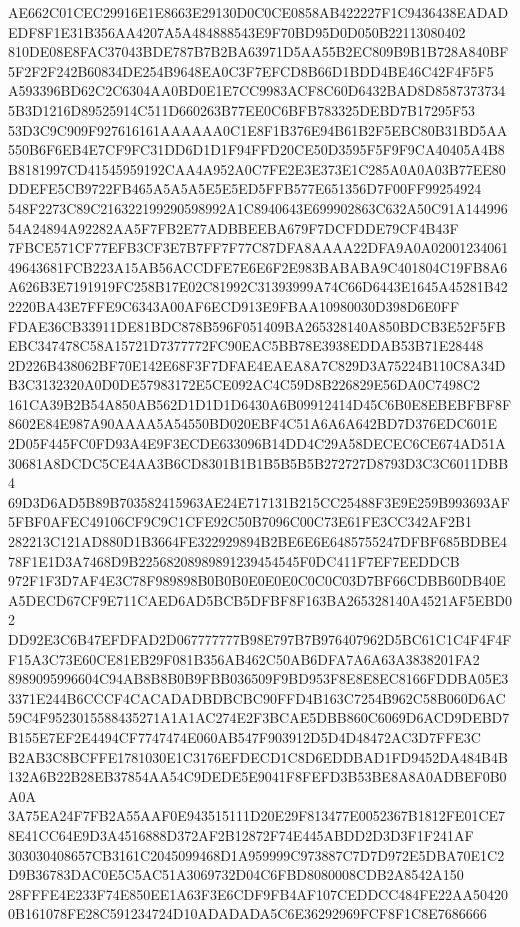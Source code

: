 \documentclass[UTF8,fontset=fandol,zihao=-4,a4paper]{ctexart}
\begin{document}
{{AE662C01CEC29916E1E8663E29130D0C0CE0858AB422227F1C9436438EADADEDF8F1E31B356AA4207A5A484888543E9F70BD95D0D050B22113080402
810DE08E8FAC37043BDE787B7B2BA63971D5AA55B2EC809B9B1B728A840BF5F2F2F242B60834DE254B9648EA0C3F7EFCD8B66D1BDD4BE46C42F4F5F5
A593396BD62C2C6304AA0BD0E1E7CC9983ACF8C60D6432BAD8D85873737345B3D1216D89525914C511D660263B77EE0C6BFB783325DEBD7B17295F53
53D3C9C909F927616161AAAAAA0C1E8F1B376E94B61B2F5EBC80B31BD5AA550B6F6EB4E7CF9FC31DD6D1D1F94FFD20CE50D3595F5F9F9CA40405A4B8
B8181997CD41545959192CAA4A952A0C7FE2E3E373E1C285A0A0A03B77EE80DDEFE5CB9722FB465A5A5A5E5E5ED5FFB577E651356D7F00FF99254924
548F2273C89C216322199290598992A1C8940643E699902863C632A50C91A14499654A24894A92282AA5F7FB2E77ADBBEEBA679F7DCFDDE79CF4B43F
7FBCE571CF77EFB3CF3E7B7FF7F77C87DFA8AAAA22DFA9A0A0200123406149643681FCB223A15AB56ACCDFE7E6E6F2E983BABABA9C401804C19FB8A6
A626B3E7191919FC258B17E02C81992C31393999A74C66D6443E1645A45281B422220BA43E7FFE9C6343A00AF6ECD913E9FBAA10980030D398D6E0FF
FDAE36CB33911DE81BDC878B596F051409BA265328140A850BDCB3E52F5FBEBC347478C58A15721D7377772FC90EAC5BB78E3938EDDAB53B71E28448
2D226B438062BF70E142E68F3F7DFAE4EAEA8A7C829D3A75224B110C8A34DB3C3132320A0D0DE57983172E5CE092AC4C59D8B226829E56DA0C7498C2
161CA39B2B54A850AB562D1D1D1D6430A6B09912414D45C6B0E8EBEBFBF8F8602E84E987A90AAAA5A54550BD020EBF4C51A6A6A642BD7D376EDC601E
2D05F445FC0FD93A4E9F3ECDE633096B14DD4C29A58DECEC6CE674AD51A30681A8DCDC5CE4AA3B6CD8301B1B1B5B5B5B272727D8793D3C3C6011DBB4
69D3D6AD5B89B703582415963AE24E717131B215CC25488F3E9E259B993693AF5FBF0AFEC49106CF9C9C1CFE92C50B7096C00C73E61FE3CC342AF2B1
282213C121AD880D1B3664FE322929894B2BE6E6E6485755247DFBF685BDBE478F1E1D3A7468D9B22568208989891239454545F0DC411F7EF7EEDDCB
972F1F3D7AF4E3C78F989898B0B0B0E0E0E0C0C0C03D7BF66CDBB60DB40EA5DECD67CF9E711CAED6AD5BCB5DFBF8F163BA265328140A4521AF5EBD02
DD92E3C6B47EFDFAD2D067777777B98E797B7B976407962D5BC61C1C4F4F4FF15A3C73E60CE81EB29F081B356AB462C50AB6DFA7A6A63A3838201FA2
8989095996604C94AB8B8B0B9FBB036509F9BD953F8E8E8EC8166FDDBA05E33371E244B6CCCF4CACADADBDBCBC90FFD4B163C7254B962C58B060D6AC
59C4F9523015588435271A1A1AC274E2F3BCAE5DBB860C6069D6ACD9DEBD7B155E7EF2E4494CF7747474E060AB547F903912D5D4D48472AC3D7FFE3C
B2AB3C8BCFFE1781030E1C3176EFDECD1C8D6EDDBAD1FD9452DA484B4B132A6B22B28EB37854AA54C9DEDE5E9041F8FEFD3B53BE8A8A0ADBEF0B0A0A
3A75EA24F7FB2A55AAF0E943515111D20E29F813477E0052367B1812FE01CE78E41CC64E9D3A4516888D372AF2B12872F74E445ABDD2D3D3F1F241AF
303030408657CB3161C2045099468D1A959999C973887C7D7D972E5DBA70E1C2D9B36783DAC0E5C5AC51A3069732D04C6FBD8080008CDB2A8542A150
28FFFE4E233F74E850EE1A63F3E6CDF9FB4AF107CEDDCC484FE22AA504200B161078FE28C591234724D10ADADADA5C6E36292969FCF8F1C8E7686666
}}
\end{document}
